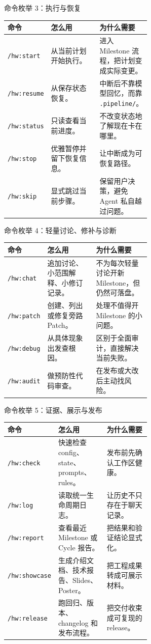 \documentclass[theme=workflow,aspectratio=169,fontset=tech]{Hypo-Slide}
\newcommand{\CommandRow}[3]{\texttt{#1} & #2 & #3 \\}
\begin{document}
\begin{frame}{命令枚举 3：执行与恢复}
  \scriptsize
  \begin{tabularx}{\textwidth}{p{0.22\linewidth}p{0.34\linewidth}X}
    \toprule
    命令 & 怎么用 & 为什么需要 \\
    \midrule
    \CommandRow{/hw:start}{从当前计划开始执行。}{进入 Milestone 流程，把计划变成实际变更。}
    \CommandRow{/hw:resume}{从保存状态恢复。}{中断后不靠模型回忆，而靠 \texttt{.pipeline/}。}
    \CommandRow{/hw:status}{只读查看当前进度。}{不改变状态地了解现在卡在哪里。}
    \CommandRow{/hw:stop}{优雅暂停并留下恢复信息。}{让中断成为可恢复路径。}
    \CommandRow{/hw:skip}{显式跳过当前步骤。}{保留用户决策，避免 Agent 私自越过问题。}
    \bottomrule
  \end{tabularx}
\end{frame}

\begin{frame}{命令枚举 4：轻量讨论、修补与诊断}
  \scriptsize
  \begin{tabularx}{\textwidth}{p{0.22\linewidth}p{0.34\linewidth}X}
    \toprule
    命令 & 怎么用 & 为什么需要 \\
    \midrule
    \CommandRow{/hw:chat}{追加讨论、小范围解释、小修订记录。}{不为每次轻量讨论开新 Milestone，但仍然可落盘。}
    \CommandRow{/hw:patch}{创建、列出或修复旁路 Patch。}{处理不值得开 Milestone 的小问题。}
    \CommandRow{/hw:debug}{从具体现象出发查根因。}{区别于全面审计，直接解决当前失败。}
    \CommandRow{/hw:audit}{做预防性代码审查。}{在发布或大改后主动找风险。}
    \bottomrule
  \end{tabularx}
\end{frame}

\begin{frame}{命令枚举 5：证据、展示与发布}
  \scriptsize
  \begin{tabularx}{\textwidth}{p{0.22\linewidth}p{0.34\linewidth}X}
    \toprule
    命令 & 怎么用 & 为什么需要 \\
    \midrule
    \CommandRow{/hw:check}{快速检查 config、state、prompts、rules。}{发布前先确认工作区健康。}
    \CommandRow{/hw:log}{读取统一生命周期日志。}{让历史不只存在于聊天记录。}
    \CommandRow{/hw:report}{查看最近 Milestone 或 Cycle 报告。}{把结果和验证结论显式化。}
    \CommandRow{/hw:showcase}{生成介绍文档、技术报告、Slides、Poster。}{把工程成果转成可展示材料。}
    \CommandRow{/hw:release}{跑回归、版本、changelog 和发布流程。}{把交付收束成可复现的 release。}
    \bottomrule
  \end{tabularx}
\end{frame}
\end{document}
